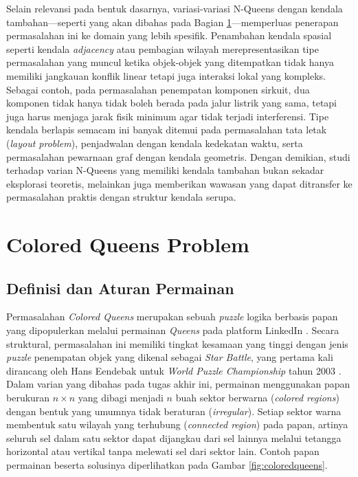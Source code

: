 Selain relevansi pada bentuk dasarnya, variasi-variasi N-Queens dengan kendala tambahan—seperti yang akan dibahas pada Bagian \ref{sec:colored-queens}—memperluas penerapan permasalahan ini ke domain yang lebih spesifik. Penambahan kendala spasial seperti kendala \textit{adjacency} atau pembagian wilayah merepresentasikan tipe permasalahan yang muncul ketika objek-objek yang ditempatkan tidak hanya memiliki jangkauan konflik linear tetapi juga interaksi lokal yang kompleks. Sebagai contoh, pada permasalahan penempatan komponen sirkuit, dua komponen tidak hanya tidak boleh berada pada jalur listrik yang sama, tetapi juga harus menjaga jarak fisik minimum agar tidak terjadi interferensi. Tipe kendala berlapis semacam ini banyak ditemui pada permasalahan tata letak (\textit{layout problem}), penjadwalan dengan kendala kedekatan waktu, serta permasalahan pewarnaan graf dengan kendala geometris. Dengan demikian, studi terhadap varian N-Queens yang memiliki kendala tambahan bukan sekadar eksplorasi teoretis, melainkan juga memberikan wawasan yang dapat ditransfer ke permasalahan praktis dengan struktur kendala serupa.

\section{Colored Queens Problem}
\label{sec:colored-queens}

\subsection{Definisi dan Aturan Permainan}
\label{subsec:colored-queens-definisi}
Permasalahan \textit{Colored Queens} merupakan sebuah \textit{puzzle} logika berbasis papan yang dipopulerkan melalui permainan \textit{Queens} pada platform LinkedIn \cite{linkedin2024queens}. Secara struktural, permasalahan ini memiliki tingkat kesamaan yang tinggi dengan jenis \textit{puzzle} penempatan objek yang dikenal sebagai \textit{Star Battle}, yang pertama kali dirancang oleh Hans Eendebak untuk \textit{World Puzzle Championship} tahun 2003 \cite{gmpuzzles2013starbattle}. Dalam varian yang dibahas pada tugas akhir ini, permainan menggunakan papan berukuran $n \times n$ yang dibagi menjadi $n$ buah sektor berwarna (\textit{colored regions}) dengan bentuk yang umumnya tidak beraturan (\textit{irregular}). Setiap sektor warna membentuk satu wilayah yang terhubung (\textit{connected region}) pada papan, artinya seluruh sel dalam satu sektor dapat dijangkau dari sel lainnya melalui tetangga horizontal atau vertikal tanpa melewati sel dari sektor lain. Contoh papan permainan beserta solusinya diperlihatkan pada Gambar \ref{fig:coloredqueens}.

